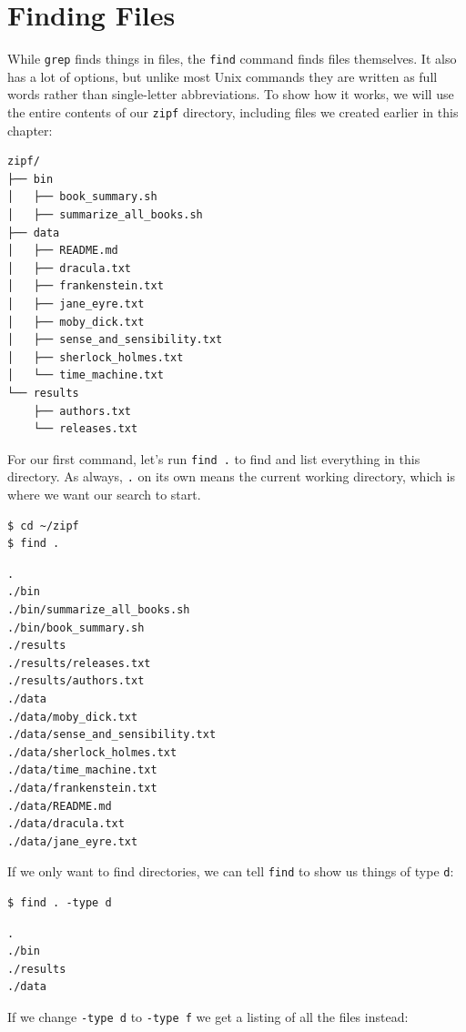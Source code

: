 \documentclass[
]{krantz}
\begin{document}
\hypertarget{bash-advanced-find}{%
\section{Finding Files}\label{bash-advanced-find}}

While \texttt{grep} finds things in files,
the \texttt{find} command finds files themselves.
It also has a lot of options,
but unlike most Unix commands they are written as full words
rather than single-letter abbreviations.
To show how it works,
we will use the entire contents of our \texttt{zipf} directory,
including files we created earlier in this chapter:

\begin{verbatim}
zipf/
├── bin
│   ├── book_summary.sh
│   ├── summarize_all_books.sh
├── data
│   ├── README.md
│   ├── dracula.txt
│   ├── frankenstein.txt
│   ├── jane_eyre.txt
│   ├── moby_dick.txt
│   ├── sense_and_sensibility.txt
│   ├── sherlock_holmes.txt
│   └── time_machine.txt
└── results
    ├── authors.txt
    └── releases.txt 
\end{verbatim}

For our first command,
let's run \texttt{find\ .} to find and list everything in this directory.
As always,
\texttt{.} on its own means the current working directory,
which is where we want our search to start.

\begin{verbatim}
$ cd ~/zipf
$ find .
\end{verbatim}

\begin{verbatim}
.
./bin
./bin/summarize_all_books.sh
./bin/book_summary.sh
./results
./results/releases.txt
./results/authors.txt
./data
./data/moby_dick.txt
./data/sense_and_sensibility.txt
./data/sherlock_holmes.txt
./data/time_machine.txt
./data/frankenstein.txt
./data/README.md
./data/dracula.txt
./data/jane_eyre.txt
\end{verbatim}

If we only want to find directories,
we can tell \texttt{find} to show us things of type \texttt{d}:

\begin{verbatim}
$ find . -type d
\end{verbatim}

\begin{verbatim}
.
./bin
./results
./data
\end{verbatim}

If we change \texttt{-type\ d} to \texttt{-type\ f}
we get a listing of all the files instead:
\end{document}
